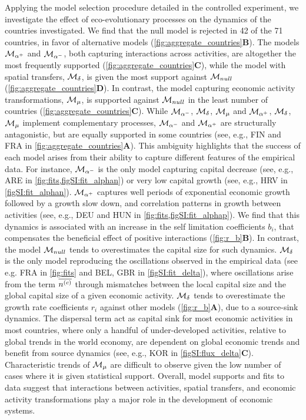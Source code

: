 Applying the model selection procedure detailed in the controlled experiment, we investigate the effect of eco-evolutionary processes on the dynamics of the countries investigated. We find that the null model is rejected in 42 of the 71 countries, in favor of alternative models (\cref{fig:aggregate_countries}\textbf{B}).
% 
The models $\mathcal{M}_{\alpha^+}$ and $\mathcal{M}_{\alpha^-}$, both capturing interactions across activities, are altogether the most frequently supported (\cref{fig:aggregate_countries}\textbf{C}),
%
while the model with spatial transfers, $\mathcal{M}_\delta$, is given the most support against $\mathcal{M}_{null}$ (\cref{fig:aggregate_countries}\textbf{D}).
% 
In contrast, the model capturing economic activity transformations, $\mathcal{M}_\mu$, is supported against $\mathcal{M}_{null}$ in the least number of countries (\cref{fig:aggregate_countries}\textbf{C}).
% 
While $\mathcal{M}_{\alpha^-}$, $\mathcal{M}_\delta$, $\mathcal{M}_\mu$ and $\mathcal{M}_{\alpha^+}$, $\mathcal{M}_\delta$, $\mathcal{M}_\mu$ implement complementary processes, $\mathcal{M}_{\alpha^-}$ and $\mathcal{M}_{\alpha^+}$ are structurally antagonistic, but are equally supported in some countries (see, e.g., FIN and FRA in \cref{fig:aggregate_countries}\textbf{A}). This ambiguity highlights that the success of each model arises from their ability to capture different features of the empirical data.
% 
For instance, $\mathcal{M}_{\alpha^-}$ is the only model capturing capital decrease (see, e.g., ARE in \cref{fig:fits,figSI:fit_alphan}) or very low capital growth (see, e.g., HRV in \cref{figSI:fit_alphan}).
% 
$\mathcal{M}_{\alpha^+}$  captures well periods of exponential economic growth followed by a growth slow down, and correlation patterns in growth between activities (see, e.g., DEU and HUN in \cref{fig:fits,figSI:fit_alphap}). We find that this dynamics is associated with an increase in the self limitation coefficients $b_i$, that compensates the beneficial effect of positive interactions (\cref{fig:r_b}\textbf{B}). In contrast, the model $\mathcal{M}_{null}$ tends to overestimates the capital size for such dynamics.
%
$\mathcal{M}_\delta$ is the only model reproducing the oscillations observed in the empirical data (see e.g. FRA in \cref{fig:fits} and BEL, GBR in \cref{figSI:fit_delta}), where oscillations arise from the term $\overline{n^{(c)}}$ through mismatches between the local capital size and the global capital size of a given economic activity. $\mathcal{M}_\delta$ tends to overestimate the growth rate coefficients $r_i$ against other models (\cref{fig:r_b}\textbf{A}), due to a source-sink dynamics. The dispersal term act as capital sink for most economic activities in most countries, where only a handful of under-developed activities, relative to global trends in the world economy, are dependent on global economic trends and benefit from source dynamics (see, e.g., KOR in \cref{figSI:flux_delta}\textbf{C}).
% 
Characteristic trends of $\mathcal{M}_\mu$ are difficult to observe given the low number of cases where it is given statistical support. 
% 
Overall, model supports and fits to data suggest that interactions between activities, spatial transfers, and economic activity transformations play a major role in the development of economic systems.

